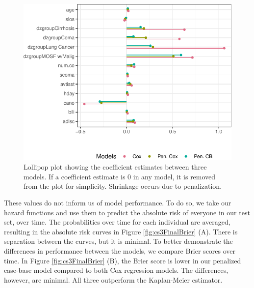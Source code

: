 \documentclass[
]{jss}
\begin{document}
\begin{CodeChunk}
\begin{figure}

{\centering \includegraphics[width=\textwidth,keepaspectratio=true]{../figures/coefplots-1} 

}

\caption{\label{fig:cs3lolliPlot} Lollipop plot showing the coefficient estimates between three models. If a coefficient estimate is 0 in any model, it is removed from the plot for simplicity. Shrinkage occurs due to penalization.}\label{fig:coefplots}
\end{figure}
\end{CodeChunk}

These values do not inform us of model performance. To do so, we take
our hazard functions and use them to predict the absolute risk of
everyone in our test set, over time. The probabilities over time for
each individual are averaged, resulting in the absolute risk curves in
Figure \ref{fig:cs3FinalBrier} (A). There is separation between the
curves, but it is minimal. To better demonstrate the differences in
performance between the models, we compare Brier scores over time. In
Figure \ref{fig:cs3FinalBrier} (B), the Brier score is lower in our
penalized case-base model compared to both Cox regression models. The
differences, however, are minimal. All three outperform the Kaplan-Meier
estimator.
\end{document}
